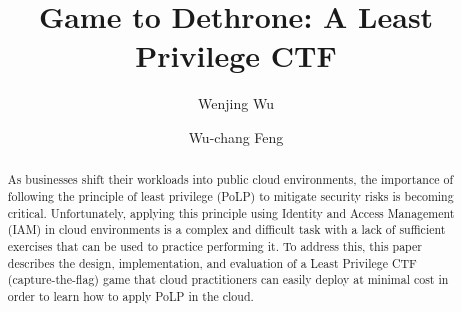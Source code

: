 \documentclass[sigconf]{acmart}
\begin{document}
\title{Game to Dethrone: A Least Privilege CTF}

\author{Wenjing Wu}
\author{Wu-chang Feng}



\begin{abstract}
	As businesses shift their workloads into public cloud environments, the importance of following the principle of least privilege (PoLP) to mitigate security risks is becoming critical.  Unfortunately, applying this principle using Identity and Access Management (IAM) in cloud environments is a complex and difficult task with a lack of sufficient exercises that can be used to practice performing it.  To address this, this paper describes the design, implementation, and evaluation of a Least Privilege CTF (capture-the-flag) game that cloud practitioners can easily  deploy at minimal cost in order to learn how to apply PoLP in the cloud.
\end{abstract}





\maketitle
\pagestyle{plain}
\end{document}
